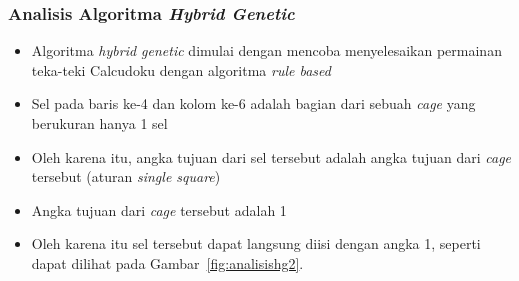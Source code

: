 \documentclass{beamer}
\begin{document}
\begin{frame}
\frametitle{Analisis Algoritma \textit{Hybrid Genetic}}
\begin{itemize}
\item Algoritma \textit{hybrid genetic} dimulai dengan mencoba menyelesaikan permainan teka-teki Calcudoku dengan algoritma \textit{rule based}
\item Sel pada baris ke-4 dan kolom ke-6 adalah bagian dari sebuah \textit{cage} yang berukuran hanya 1 sel
\item Oleh karena itu, angka tujuan dari sel tersebut adalah angka tujuan dari \textit{cage} tersebut (aturan \textit{single square})
\item Angka tujuan dari \textit{cage} tersebut adalah 1
\item Oleh karena itu sel tersebut dapat langsung diisi dengan angka 1, seperti dapat dilihat pada Gambar~\ref{fig:analisishg2}.
\end{itemize}
\end{frame}

\end{document}
